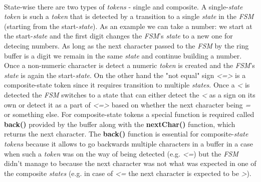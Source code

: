   	\paragraph{}
  	  State-wise there are two types of \textit{tokens} - single and composite. A single-\textit{state} \textit{token} is such a \textit{token} that is detected by a transition to a single \textit{state} in the \textit{FSM} (starting from the start-\textit{state}). As an example we can take a number: we start at the start-\textit{state} and the first digit changes the \textit{FSM}'s \textit{state} to a new one for detecing numbers. As long as the next character passed to the \textit{FSM} by the ring buffer is a digit we remain in the same \textit{state} and continue building a number. Once a non-numeric character is detect a numeric \textit{token} is created and the \textit{FSM}'s \textit{state} is again the start-\textit{state}. On the other hand the "not equal" sign \textit{\textless=\textgreater} is a composite-state token since it requires transition to multiple \textit{states}. Once a \textit{\textless} is detected the \textit{FSM} switches to a state that can either detect the \textit{\textless} as a sign on its own or detect it as a part of \textit{\textless=\textgreater} based on whether the next character being \textit{=} or something else. For composite-state tokens a special function is required called \textbf{back()} provided by the buffer along with the \textbf{nextChar()} function, which returns the next character. The \textbf{back()} function is essential for composite-\textit{state} \textit{tokens} because it allows to go backwards multiple characters in a buffer in a case when such a \textit{token} was on the way of being detected (e.g. \textit{\textless=}) but the \textit{FSM} didn't manage to because the next character was not what was expected in one of the composite \textit{states} (e.g. in case of \textit{\textless=} the next character is expected to be \textit{\textgreater}).
  	  
